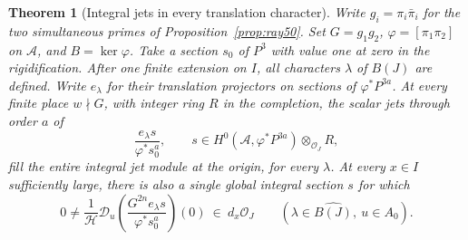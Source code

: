 \documentclass[a4paper,11pt]{article}
\newtheorem{theorem}[proposition]{Theorem}
\theoremstyle{definition}
\theoremstyle{remark}
\numberwithin{equation}{section}
\begin{document}
\begin{theorem}[Integral jets in every translation character]\label{thm:project53}
Write \(g_i=\pi_i\bar\pi_i\) for the two simultaneous primes of
Proposition~\ref{prop:ray50}. Set \(G=g_1g_2\),
\(\varphi=[\pi_1\pi_2]\) on \(\mathcal A\), and \(B=\ker\varphi\).
Take a section \(s_0\) of \(P^3\) with value one at zero in the
rigidification. After one finite extension on \(I\), all characters
\(\lambda\) of \(B(J)\) are defined. Write \(e_\lambda\) for their
translation projectors on sections of \(\varphi^*P^{3a}\).
At every finite place \(w\nmid G\), with integer ring \(R\) in the
completion, the scalar jets through order \(a\) of
\[
        \frac{e_\lambda s}{\varphi^*s_0^a},
       \qquad s\in H^0(\mathcal A,\varphi^*P^{3a})\otimes_{\mathcal O_J}R,
\]
fill the entire integral jet module at the origin, for every
\(\lambda\). At every \(x\in I\) sufficiently large, there is also
a single global integral section \(s\) for which
\begin{equation}
   0\ne
      \frac{1}{\mathcal H}\mathcal D_u
        \left(\frac{G^{2n}e_\lambda s}{\varphi^*s_0^a}\right)(0)
                 \ \in\ d_x\mathcal O_J
             \qquad(\lambda\in\widehat{B(J)},\ u\in A_0).
                                                            \label{eq:project53}
\end{equation}
\end{theorem}
\end{document}
